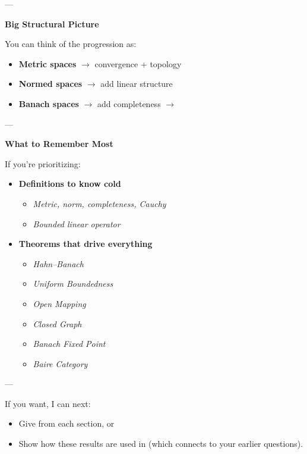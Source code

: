 \documentclass[12pt,a4paper]{report}
\begin{document}
\begin{description}
\begin{itemize}
    \end{itemize}
---

\item \textbf{Big Structural Picture}

You can think of the progression as:

        \begin{itemize}
        \item \textbf{Metric spaces} $\to$ convergence + topology

        \item \textbf{Normed spaces} $\to$ add linear structure

        \item \textbf{Banach spaces} $\to$ add completeness $\to$ 

        \end{itemize}
---

\item \textbf{What to Remember Most}

If you’re prioritizing:

    \begin{itemize}
        \item \textbf{Definitions to know cold}

            \begin{itemize}
            \item \textit{Metric, norm, completeness, Cauchy}
            \item \textit{Bounded linear operator}
            \end{itemize}

        \item \textbf{Theorems that drive everything}

            \begin{itemize}
            \item \textit{Hahn–Banach}
            \item \textit{Uniform Boundedness}
            \item \textit{Open Mapping}
            \item \textit{Closed Graph}
            \item \textit{Banach Fixed Point}
            \item \textit{Baire Category}
            \end{itemize}
    \end{itemize}

---
\end{description}

If you want, I can next:

            \begin{itemize}
            \item Give  from each section, or
            \item Show how these results are used in  (which connects to your earlier questions).
            \end{itemize}
\end{document}
